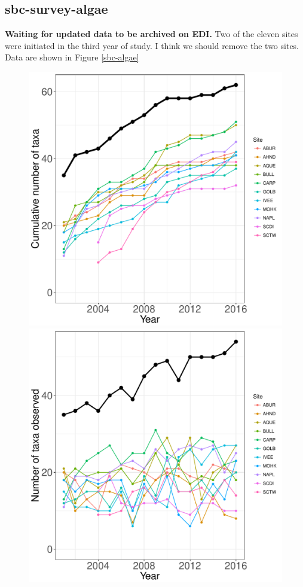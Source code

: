 \documentclass[11pt, oneside]{article}
\begin{document}
\subsection {sbc-survey-algae}
{\bf Waiting for updated data to be archived on EDI.}
Two of the eleven sites were initiated in the third year of study.
I think we should remove the two sites.
Data are shown in Figure \ref{sbc-algae}
\begin{figure}[h!]
\centering
\includegraphics[scale = 0.4]{sbc-algae-castorani_species_accumulation_curve.pdf}
\includegraphics[scale = 0.4]{sbc-algae-castorani_num_taxa_over_time.pdf}

\end{figure}
\end{document}
